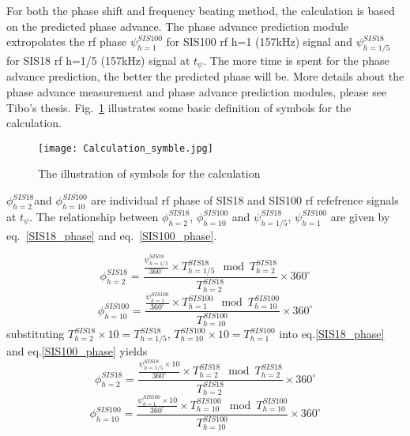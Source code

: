 For both the phase shift and frequency beating method, the calculation is based on the predicted phase advance. The phase advance prediction module extropolates the rf phase $\psi_{h=1}^{SIS100}$ for SIS100 rf h=1 (157kHz) signal and $\psi_{h=1/5}^{SIS18}$ for SIS18 rf h=1/5 (157kHz) signal at $t_{\psi}$. The more time is spent for the phase advance prediction, the better the predicted phase will be. More details about the phase advance measurement and phase advance prediction modules, please see Tibo's thesis. Fig.~\ref{Calculation_symble} illustrates some basic definition of symbols for the calculation. 
\begin{figure}[!htb]
   \centering   
   \texttt{[image: Calculation\_symble.jpg]}
   \caption{The illustration of symbols for the calculation}
   \label{Calculation_symble}
\end{figure}
$\phi_{h=2}^{SIS18}$and $\phi_{h=10}^{SIS100}$ are individual rf phase of SIS18 and SIS100 rf refefrence signals at $t_{\psi}$. The relationship between $\phi_{h=2}^{SIS18}$, $\phi_{h=10}^{SIS100}$ and $\psi_{h=1/5}^{SIS18}$, $\psi_{h=1}^{SIS100}$ are given by eq.~\ref{SIS18_phase} and eq.~\ref{SIS100_phase}. 

\begin{equation}
\phi_{h=2}^{SIS18} =  \frac {\frac{\psi_{h=1/5}^{SIS18}}{360^\circ}\times {T_{h=1/5}^{SIS18}} \mod {T_{h=2}^{SIS18}}}{T_{h=2}^{SIS18}}\times {360^\circ} \label{SIS18_phase}
\end{equation}
\begin{equation}
\phi_{h=10}^{SIS100} =  \frac {\frac{\psi_{h=1}^{SIS100}}{360^\circ}\times {T_{h=1}^{SIS100}} \mod {T_{h=10}^{SIS100}}}{T_{h=10}^{SIS100}}\times {360^\circ} \label{SIS100_phase}
\end{equation}
substituting $T_{h=2}^{SIS18}\times 10=T_{h=1/5}^{SIS18}$, $T_{h=10}^{SIS100}\times 10=T_{h=1}^{SIS100}$ into eq.\ref{SIS18_phase} and eq.\ref{SIS100_phase} yields
 \begin{equation}
\phi_{h=2}^{SIS18} =  \frac {\frac{\psi_{h=1/5}^{SIS18}\times 10}{360^\circ}\times {T_{h=2}^{SIS18}} \mod {T_{h=2}^{SIS18}}}{T_{h=2}^{SIS18}}\times {360^\circ} \label{SIS18_phase1}
\end{equation}
\begin{equation}
\phi_{h=10}^{SIS100} =  \frac {\frac{\psi_{h=1}^{SIS100}\times 10}{360^\circ}\times {T_{h=10}^{SIS100}} \mod {T_{h=10}^{SIS100}}}{T_{h=10}^{SIS100}}\times {360^\circ} \label{SIS100_phase1}
\end{equation}


